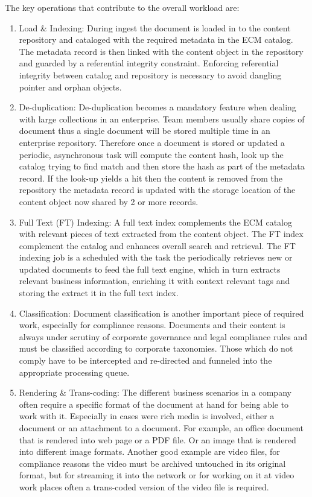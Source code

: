 The key operations that contribute to the overall workload are:
\begin{enumerate}
\item Load \& Indexing:  
During ingest the document is loaded in to the content repository and cataloged with the required metadata in the ECM catalog. The metadata record is then linked with the content object in the repository and guarded by a referential integrity constraint. Enforcing referential integrity between catalog and repository is necessary to avoid dangling pointer and orphan objects. 
\item De-duplication:  
De-duplication becomes a mandatory feature when dealing with large collections in an enterprise. Team members usually share copies of document thus a single document will be stored multiple time in an enterprise repository. Therefore once a document is stored or updated a periodic, asynchronous task will compute the content hash, look up the catalog trying to find match and then store the hash as part of the metadata record. If the look-up yields a hit then the content is removed from the repository the metadata record is updated with the storage location of the content object now shared by 2 or more records.
\item Full Text (FT) Indexing:  
A full text index complements the ECM catalog with relevant pieces of text extracted from the content object. The FT index complement the catalog and enhances overall search and retrieval. The FT indexing job is a scheduled with the task the periodically retrieves new or updated documents to feed the full text engine, which in turn extracts relevant business information, enriching it with context relevant tags and storing the extract it in the full text index.
\item Classification:  
Document classification is another important piece of required work, especially for compliance reasons. Documents and their content is always under scrutiny of corporate governance and legal compliance rules and must be classified according to corporate taxonomies. Those which do not comply have to be intercepted and re-directed and funneled into the appropriate processing queue.  
\item Rendering \& Trans-coding:  
The different business scenarios in a company often require a specific format of the document at hand for being able to work with it. Especially in cases were rich media is involved, either a document or an attachment to a document. For example, an office document that is rendered into web page or a PDF file. Or an image that is rendered into different image formats. Another good example are video files, for compliance reasons the video must be archived untouched in its original format, but for streaming it into the network or for working on it at video work places often a trans-coded version of the video file is required.  

\end{enumerate}
